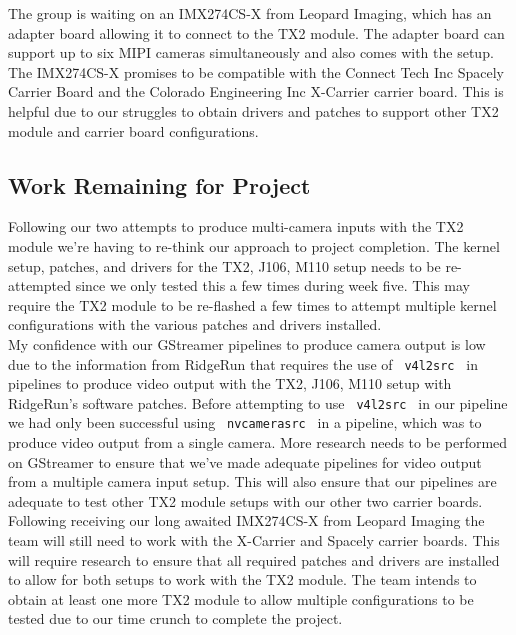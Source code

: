\documentclass[letterpaper,10pt,serif,draftclsnofoot,onecolumn,compsoc,titlepage]{IEEEtran}
\begin{document}
The group is waiting on an IMX274CS-X from Leopard Imaging, which has an 
adapter board allowing it to connect to the TX2 module. The adapter board can support 
up to six MIPI cameras simultaneously and also comes with the setup. The IMX274CS-X 
promises to be compatible with the Connect Tech Inc Spacely Carrier
Board and the Colorado Engineering Inc X-Carrier carrier board. This is helpful due to 
our struggles to obtain drivers and patches to support other TX2 module and carrier 
board configurations. \\


\subsection{Work Remaining for Project}

Following our two attempts to produce multi-camera inputs with the TX2 module 
we're having to re-think our approach to project completion. The kernel setup, patches, 
and drivers for the TX2, J106, M110 setup needs to be re-attempted since we only tested 
this a few times during week five. This may require the TX2 module to be re-flashed a 
few times to attempt multiple kernel configurations with the various patches and drivers 
installed. \\

My confidence with our GStreamer pipelines to produce camera output is 
low due to the information from RidgeRun that requires the use of 
\texttt{ v4l2src } in pipelines to produce video output with the TX2, J106, M110 setup with 
RidgeRun's software patches. 
Before attempting to use \texttt{ v4l2src } in our pipeline we had only been successful 
using \texttt{ nvcamerasrc } in a pipeline, which was to produce video output from a 
single camera. More research needs to be performed on GStreamer to ensure that we've 
made adequate pipelines for video output from a multiple camera input setup. This will 
also ensure that our pipelines are adequate to test other TX2 module setups with our 
other two carrier boards. \\

Following receiving our long awaited IMX274CS-X from Leopard Imaging the team will 
still need to work with the X-Carrier and Spacely carrier boards. This will 
require research to ensure that all required patches and drivers are installed 
to allow for both setups to work with the TX2 module. The team intends to obtain at 
least one more TX2 module to allow multiple configurations to be tested due to our 
time crunch to complete the project. \\
\end{document}
